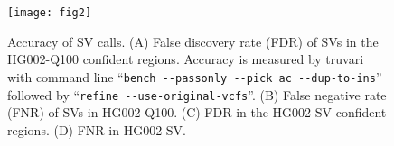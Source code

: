 \documentclass[a4paper,num-refs]{oup-contemporary}
\begin{document}
\begin{figure}[tb]
\texttt{[image: fig2]}
\caption{Accuracy of SV calls.
(A) False discovery rate (FDR) of SVs in the HG002-Q100 confident regions.
Accuracy is measured by truvari with command line ``{\tt bench -{}-passonly -{}-pick ac -{}-dup-to-ins}''
followed by ``{\tt refine -{}-use-original-vcfs}''.
(B) False negative rate (FNR) of SVs in HG002-Q100.
(C) FDR in the HG002-SV confident regions.
(D) FNR in HG002-SV.}\label{fig:acc}
\end{figure}

%
%
%
%
%
%
%
%
%
%
\end{document}
